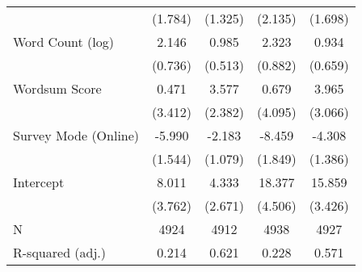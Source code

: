 \begin{table}[h]
\begin{tabular}{lcccc}
   & (1.784) & (1.325) & (2.135) & (1.698) \\ 
  Word Count (log) &   2.146 &   0.985 &   2.323 &   0.934 \\ 
   & (0.736) & (0.513) & (0.882) & (0.659) \\ 
  Wordsum Score &   0.471 &   3.577 &   0.679 &   3.965 \\ 
   & (3.412) & (2.382) & (4.095) & (3.066) \\ 
  Survey Mode (Online) &  -5.990 &  -2.183 &  -8.459 &  -4.308 \\ 
   & (1.544) & (1.079) & (1.849) & (1.386) \\ 
  Intercept &   8.011 &   4.333 &  18.377 &  15.859 \\ 
   & (3.762) & (2.671) & (4.506) & (3.426) \\ 
   \hline
N & 4924 & 4912 & 4938 & 4927 \\ 
  R-squared (adj.) & 0.214 & 0.621 & 0.228 & 0.571 \\ 
   \hline
\end{tabular}
\endgroup
\end{table}
